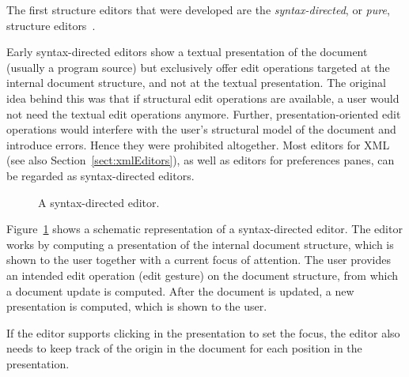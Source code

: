 \documentclass{speauth}
\begin{document}

The first structure editors that were developed are the {\em syntax-directed}, or {\em pure}, structure editors~\cite{reps84synGen,Bahlke86PSG,magnusson90orm}.

Early syntax-directed editors show a textual presentation of the document (usually a program source) but exclusively offer edit operations targeted at the internal document structure, and not at the textual presentation. The original idea behind this was that if structural edit operations are available, a user would not need the textual edit operations anymore. Further, presentation-oriented edit operations would interfere with the user's structural model of the document and introduce errors. Hence they were prohibited altogether. Most editors for XML (see also Section~\ref{sect:xmlEditors}), as well as editors for preferences panes, can be regarded as syntax-directed editors.

\begin{figure}

\begin{small}

\begin{center}

\begin{center}


\end{center}\caption{A syntax-directed editor.}\label{synDirEdit} 

\end{center}

\end{small}

\end{figure}

Figure~\ref{synDirEdit} shows a schematic representation of a syntax-directed editor. The editor works by computing a presentation of the internal document structure, which is shown to the user together with a current focus of attention. The user provides an intended edit operation (edit gesture) on the document structure, from which a document update is computed. After the document is updated, a new presentation is computed, which is shown to the user.

If the editor supports clicking in the presentation to set the focus, the editor also needs to keep track of the origin in the document for each position in the presentation.
\end{document}
